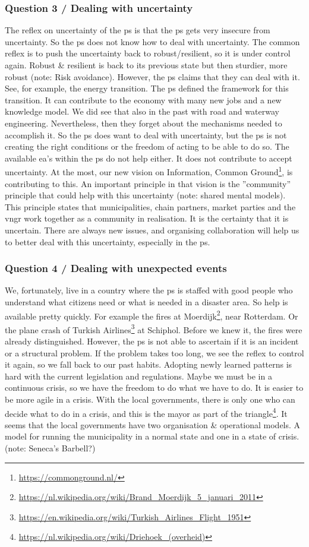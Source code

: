 \subsubsection{Question 3 / Dealing with uncertainty}
The reflex on \gls{uncertainty} of the \gls{ps} is that the \gls{ps} gets very insecure from \gls{uncertainty}. So the \gls{ps} does not know how to deal with \gls{uncertainty}. The common reflex is to push the uncertainty back to robust/resilient, so it is under control again. Robust \& resilient is back to its previous state but then sturdier, more robust (note: Risk avoidance). However, the \gls{ps} claims that they can deal with it. See, for example, the energy transition. The \gls{ps} defined the framework for this transition. It can contribute to the economy with many new jobs and a new knowledge model. We did see that also in the past with road and waterway engineering. Nevertheless, then they forget about the mechanisms needed to accomplish it. So the \gls{ps} does want to deal with \gls{uncertainty}, but the \gls{ps} is not creating the right conditions or the freedom of acting to be able to do so.
The available \gls{ea}'s within the \gls{ps} do not help either. It does not contribute to accept \gls{uncertainty}. At the most, our new vision on Information, Common Ground\footnote{\url{https://commonground.nl/}}, is contributing to this. An important principle in that vision is the ''community'' principle that could help with this \gls{uncertainty} (note: shared mental models). This principle states that municipalities, chain partners, market parties and the \acrshort{vngr} work together as a community in realisation. It is the certainty that it is uncertain. There are always new issues, and organising collaboration will help us to better deal with this \gls{uncertainty}, especially in the \gls{ps}.
\subsubsection{Question 4 / Dealing with unexpected events}
We, fortunately, live in a country where the \gls{ps} is staffed with good people who understand what citizens need or what is needed in a disaster area. So help is available pretty quickly. For example the fires at Moerdijk\footnote{\url{https://nl.wikipedia.org/wiki/Brand_Moerdijk_5_januari_2011}}, near Rotterdam. Or the plane crash of Turkish Airlines\footnote{\url{https://en.wikipedia.org/wiki/Turkish_Airlines_Flight_1951}} at Schiphol. Before we knew it, the fires were already distinguished. However, the \gls{ps} is not able to ascertain if it is an incident or a structural problem. If the problem takes too long, we see the reflex to control it again, so we fall back to our past habits. Adopting newly learned patterns is hard with the current legislation and regulations. Maybe we must be in a continuous crisis, so we have the freedom to do what we have to do. It is easier to be more agile in a crisis. With the local governments, there is only one who can decide what to do in a crisis, and this is the mayor as part of the triangle\footnote{\url{https://nl.wikipedia.org/wiki/Driehoek_(overheid)}}. 
It seems that the local governments have two organisation \& operational models. A model for running the municipality in a normal state and one in a state of crisis. (note: Seneca's Barbell?)
